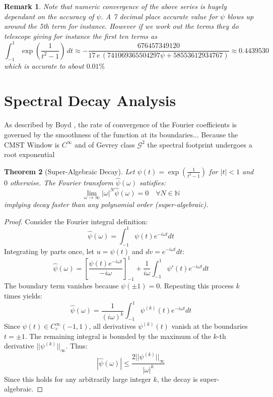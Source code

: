\documentclass[11pt]{article}
\theoremstyle{breakdef}
\newtheorem{theorem}{Theorem}[section]
\newtheorem{remark}[theorem]{Remark}
\begin{document}
\begin{remark}
Note that numeric convergence of the above series is hugely dependant on the accuracy of $\psi$.  A 7 decimal place accurate value for $\psi$ blows up around the 5th term for instance.  However if we work out the terms they do telescope giving for instance the first ten terms as
\begin{equation}
\int_{-1}^{1}  \exp\left(\frac{1}{t^2 -1}\right)\, dt 
\approx -\frac{676457349120}{17\, e \, (741069365504297 \psi +58553612934767)} \approx 0.4439530
\end{equation}
which is accurate to about $0.01\%$

\end{remark}


\section{Spectral Decay Analysis}

As described by Boyd \cite{Boyd2001}, the rate of convergence of the Fourier coefficients is governed by the smoothness of the function at its boundaries...
Because the CMST Window is $C^{\infty}$ and of Gevrey class $\mathcal{G}^2$ the spectral footprint undergoes a root exponential

\begin{theorem}[Super-Algebraic Decay]
Let $\psi(t) = \exp\left(\frac{1}{t^2-1}\right)$ for $|t| < 1$ and $0$ otherwise. The Fourier transform $\hat{\psi}(\omega)$ satisfies:
\begin{equation}
\lim_{\omega \to \infty} |\omega|^N \hat{\psi}(\omega) = 0 \quad \forall N \in \mathbb{N}
\end{equation}
implying decay faster than any polynomial order (super-algebraic).
\end{theorem}

\begin{proof}
Consider the Fourier integral definition:
\begin{equation}
\hat{\psi}(\omega) = \int_{-1}^{1} \psi(t) e^{-i\omega t} dt
\end{equation}
Integrating by parts once, let $u = \psi(t)$ and $dv = e^{-i\omega t}dt$:
\begin{equation}
\hat{\psi}(\omega) = \left[ \frac{\psi(t) e^{-i\omega t}}{-i\omega} \right]_{-1}^{1} + \frac{1}{i\omega} \int_{-1}^{1} \psi'(t) e^{-i\omega t} dt
\end{equation}
The boundary term vanishes because $\psi(\pm 1) = 0$. Repeating this process $k$ times yields:
\begin{equation}
\hat{\psi}(\omega) = \frac{1}{(i\omega)^k} \int_{-1}^{1} \psi^{(k)}(t) e^{-i\omega t} dt
\end{equation}
Since $\psi(t) \in C_c^\infty(-1, 1)$, all derivatives $\psi^{(k)}(t)$ vanish at the boundaries $t=\pm 1$. The remaining integral is bounded by the maximum of the $k$-th derivative $||\psi^{(k)}||_\infty$. Thus:
\begin{equation}
|\hat{\psi}(\omega)| \leq \frac{2 ||\psi^{(k)}||_\infty}{|\omega|^k}
\end{equation}
Since this holds for any arbitrarily large integer $k$, the decay is super-algebraic.
\end{proof}
\end{document}
